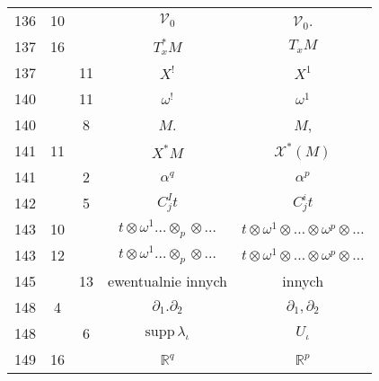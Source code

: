 \documentclass[a4paper,11pt]{article}
\newcommand{\mb}{\mathbb}
\newcommand{\mc}{\mathcal}
\newcommand{\mr}{\mathrm}
\newcommand{\pr}{\partial}
\newcommand{\ld}{\ldots}
\newcommand{\ot}{\otimes}
\newcommand{\supp}{\mr{supp}}
\newcommand{\al}{\alpha}
\newcommand{\io}{\iota}
\newcommand{\la}{\lambda}
\newcommand{\om}{\omega}
\newcommand{\R}{\mb{R}}
\newcommand{\V}{\mc{V}}
\newcommand{\X}{\mc{X}}
\begin{document}
\begin{center}
\begin{tabular}{|c|c|c|c|c|}
    136 & 10 & & $\V_{ 0 }$ & $\V_{ 0 }$. \\
    137 & 16 & & $T^{ * }_{ x }M$ & $T_{ x }M$ \\
    137 & & 11 & $X^{ ! }$ & $X^{ 1 }$ \\
    140 & & 11 & $\om^{ ! }$ & $\om^{ 1 }$ \\
    140 & &  8 & $M$. & $M$, \\
    141 & 11 & & $X^{ * } M$ & $\X^{ * }( M )$ \\
    141 & & 2 & $\al^{ q }$ & $\al^{ p }$ \\
    142 & & 5 & $C^{ I }_{ j } t$ & $C^{ i }_{ j } t$ \\
    143 & 10 & & $t \ot \om^{ 1 } \ld \ot_{ p } \ot \ld$
           & $t \ot \om^{ 1 } \ot \ld \ot \om^{ p } \ot \ld$ \\
    143 & 12 & & $t \ot \om^{ 1 } \ld \ot_{ p } \ot \ld$
           & $t \ot \om^{ 1 } \ot \ld \ot \om^{ p } \ot \ld$ \\
    145 & & 13 & ewentualnie innych & innych \\
    148 & 4 & & $\pr_{ 1 }.\pr_{ 2 }$ & $\pr_{ 1 }, \pr_{ 2 }$ \\
    148 & & 6 & $\supp\, \la_{ \io }$ & $U_{ \io }$ \\
    149 & 16 & & $\R^{ q }$ & $\R^{ p }$ \\ \hline
  \end{tabular}


\end{center}
\end{document}
